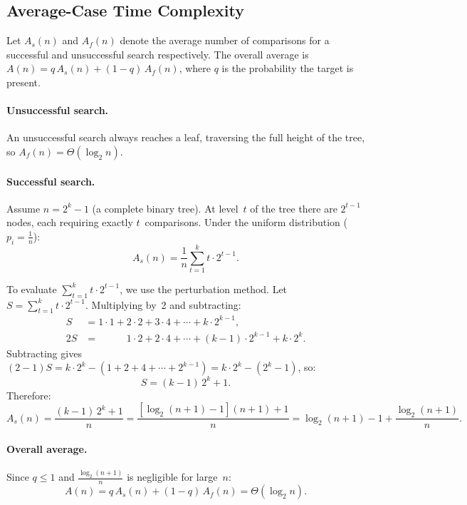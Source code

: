 \documentclass[11pt, a4paper, notitlepage]{report}
\theoremstyle{definition}
\theoremstyle{remark}
\theoremstyle{definition}
\begin{document}
\subsection{Average-Case Time Complexity}
\label{subsec:binsearch-avg}

Let $A_s(n)$ and $A_f(n)$ denote the average number of comparisons for a
successful and unsuccessful search respectively.  The overall average is
$A(n) = q\,A_s(n) + (1-q)\,A_f(n)$, where $q$ is the probability the target
is present.

\paragraph{Unsuccessful search.}
An unsuccessful search always reaches a leaf, traversing the full height of the
tree, so $A_f(n) = \Theta(\log_2 n)$.

\paragraph{Successful search.}
Assume $n = 2^k - 1$ (a complete binary tree).  At level~$t$ of the tree there
are $2^{t-1}$ nodes, each requiring exactly $t$~comparisons.  Under the uniform
distribution ($p_i = \tfrac{1}{n}$):
\[
  A_s(n) = \frac{1}{n}\sum_{t=1}^{k} t \cdot 2^{t-1}.
\]

To evaluate $\sum_{t=1}^{k} t\cdot 2^{t-1}$, we use the perturbation method.
Let $S = \sum_{t=1}^{k} t\cdot 2^{t-1}$.  Multiplying by~2 and subtracting:
\begin{align*}
  S &= 1\cdot 1 + 2\cdot 2 + 3\cdot 4 + \cdots + k\cdot 2^{k-1}, \\
  2S &= \phantom{1\cdot 1 + {}} 1\cdot 2 + 2\cdot 4 + \cdots + (k-1)\cdot 2^{k-1} + k\cdot 2^k.
\end{align*}
Subtracting gives $(2-1)S = k\cdot 2^k - (1 + 2 + 4 + \cdots + 2^{k-1})
= k\cdot 2^k - (2^k - 1)$, so:
\[
  S = (k-1)\,2^k + 1.
\]
Therefore:
\[
  A_s(n) = \frac{(k-1)\,2^k + 1}{n}
         = \frac{[\log_2(n+1) - 1](n+1) + 1}{n}
         = \log_2(n+1) - 1 + \frac{\log_2(n+1)}{n}.
\]

\paragraph{Overall average.}
Since $q \le 1$ and $\frac{\log_2(n+1)}{n}$ is negligible for large~$n$:
\[
  A(n) = q\,A_s(n) + (1-q)\,A_f(n) = \Theta(\log_2 n).
\]
\end{document}
